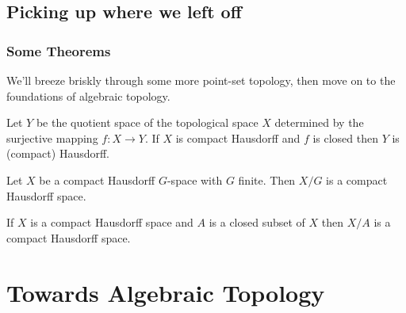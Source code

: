 \documentclass{fkbook}
\begin{document}
\section{Picking up where we left off}
\begin{adjustwidth}{1em}{1em}
  \subsection{Some Theorems}
  We'll breeze briskly through some more point-set topology, then move
  on to the foundations of algebraic topology.
  \begin{theorem}
    Let $Y$ be the quotient space of the topological space $X$
    determined by the surjective mapping $f : X \to Y$. If $X$ is
    compact Hausdorff and $f$ is closed then $Y$ is (compact)
    Hausdorff.
  \end{theorem}
  \begin{corollary}
    Let $X$ be a compact Hausdorff $G$-space with $G$ finite. Then
    $X/G$ is a compact Hausdorff space.
  \end{corollary}
  \begin{corollary}
    If $X$ is a compact Hausdorff space and $A$ is a closed subset of
    $X$ then $X/A$ is a compact Hausdorff space.
  \end{corollary}
\end{adjustwidth}

\chapter{Towards Algebraic Topology}
\end{document}
